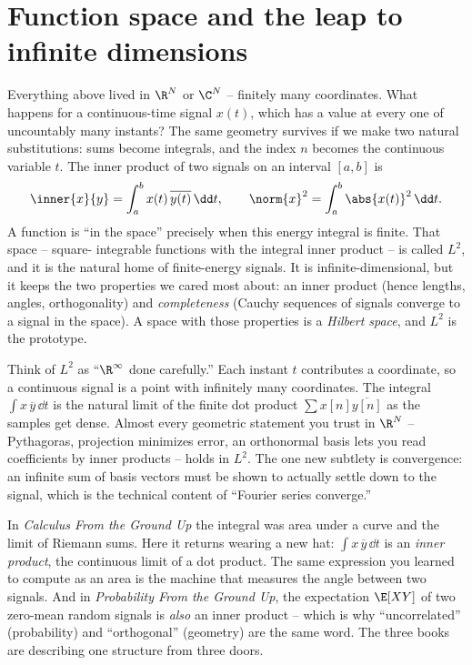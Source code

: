 \section{Function space and the leap to infinite dimensions}
\label{ch03:l2}

Everything above lived in $\R^N$ or $\C^N$ -- finitely many coordinates. What happens for a
continuous-time signal $x(t)$, which has a value at every one of uncountably many instants? The same
geometry survives if we make two natural substitutions: sums become integrals, and the index $n$
becomes the continuous variable $t$. The inner product of two signals on an interval $[a,b]$ is
\[
  \inner{x}{y} = \int_a^b x(t)\,\overline{y(t)}\,\dd t,
  \qquad \norm{x}^2 = \int_a^b \abs{x(t)}^2\,\dd t .
\]
A function is ``in the space'' precisely when this energy integral is finite. That space -- square-
integrable functions with the integral inner product -- is called $L^2$, and it is the natural home
of finite-energy signals. It is infinite-dimensional, but it keeps the two properties we cared most
about: an inner product (hence lengths, angles, orthogonality) and \emph{completeness} (Cauchy
sequences of signals converge to a signal in the space). A space with those properties is a
\emph{Hilbert space}, and $L^2$ is the prototype.

\begin{intuitionbox}
Think of $L^2$ as ``$\R^\infty$ done carefully.'' Each instant $t$ contributes a coordinate, so a
continuous signal is a point with infinitely many coordinates. The integral $\int x\,\overline y\,\dd
t$ is the natural limit of the finite dot product $\sum x[n]\overline{y[n]}$ as the samples get dense.
Almost every geometric statement you trust in $\R^N$ -- Pythagoras, projection minimizes error, an
orthonormal basis lets you read coefficients by inner products -- holds in $L^2$. The one new
subtlety is convergence: an infinite sum of basis vectors must be shown to actually settle down to
the signal, which is the technical content of ``Fourier series converge.''
\end{intuitionbox}

\begin{connectionbox}
In \emph{Calculus From the Ground Up} the integral was area under a curve and the limit of Riemann
sums. Here it returns wearing a new hat: $\int x\,\overline y\,\dd t$ is an \emph{inner product}, the
continuous limit of a dot product. The same expression you learned to compute as an area is the
machine that measures the angle between two signals. And in \emph{Probability From the Ground Up},
the expectation $\E[XY]$ of two zero-mean random signals is \emph{also} an inner product -- which is
why ``uncorrelated'' (probability) and ``orthogonal'' (geometry) are the same word. The three books
are describing one structure from three doors.
\end{connectionbox}

